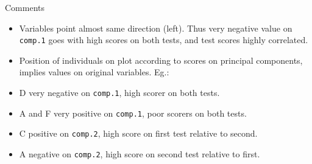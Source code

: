 \documentclass[ignorenonframetext,]{beamer}
\begin{document}
\begin{frame}[fragile]{Comments}
\protect\hypertarget{comments-25}{}

\begin{itemize}
\item
  Variables point almost same direction (left). Thus very negative value
  on \texttt{comp.1} goes with high scores on both tests, and test
  scores highly correlated.
\item
  Position of individuals on plot according to scores on principal
  components, implies values on original variables. Eg.:
\item
  D very negative on \texttt{comp.1}, high scorer on both tests.
\item
  A and F very positive on \texttt{comp.1}, poor scorers on both tests.
\item
  C positive on \texttt{comp.2}, high score on first test relative to
  second.
\item
  A negative on \texttt{comp.2}, high score on second test relative to
  first.
\end{itemize}

\end{frame}
\end{document}
